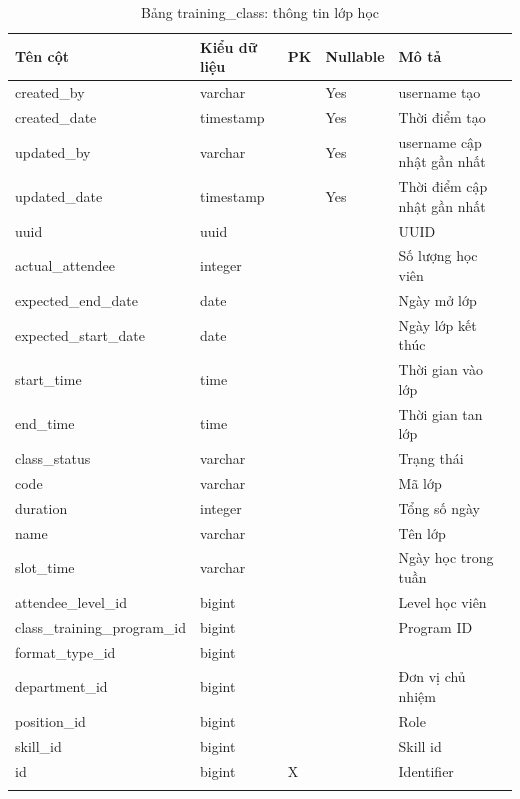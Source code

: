 \documentclass[report.tex]{subfiles}
\begin{document}
\begin{table}[!htb]
\begin{longtable}{|p{3cm}|p{3cm}|p{1cm}|p{1.6cm}|p{6cm}|}
\hline
\textbf{Tên cột} & \textbf{Kiểu dữ liệu} & \textbf{PK} & \textbf{Nullable} & \textbf{Mô tả} \\
\hline
created\_by & varchar & & Yes & username tạo \\
created\_date & timestamp & & Yes & Thời điểm tạo \\
updated\_by & varchar & & Yes & username cập nhật gần nhất \\
updated\_date & timestamp & & Yes & Thời điểm cập nhật gần nhất \\
uuid & uuid & & & UUID \\
actual\_attendee & integer & & & Số lượng học viên \\
expected\_end\_date & date & & & Ngày mở lớp \\
expected\_start\_date & date & & & Ngày lớp kết thúc \\
start\_time & time & & & Thời gian vào lớp \\
end\_time & time & & & Thời gian tan lớp \\
class\_status & varchar & & & Trạng thái \\
code & varchar & & & Mã lớp \\
duration & integer & & & Tổng số ngày \\
name & varchar & & & Tên lớp \\
slot\_time & varchar & & & Ngày học trong tuần \\
attendee\_level\_id & bigint & & & Level học viên \\
class\_training\_program\_id & bigint & & & Program ID \\
format\_type\_id & bigint & & & \\
department\_id & bigint & & & Đơn vị chủ nhiệm \\
position\_id & bigint & & & Role \\
skill\_id & bigint & & & Skill id \\
id & bigint & X & & Identifier \\
\hline
\caption[Bảng training\_class]{Bảng training\_class: thông tin lớp học}
\end{longtable}
\end{table}
\FloatBarrier
\end{document}
